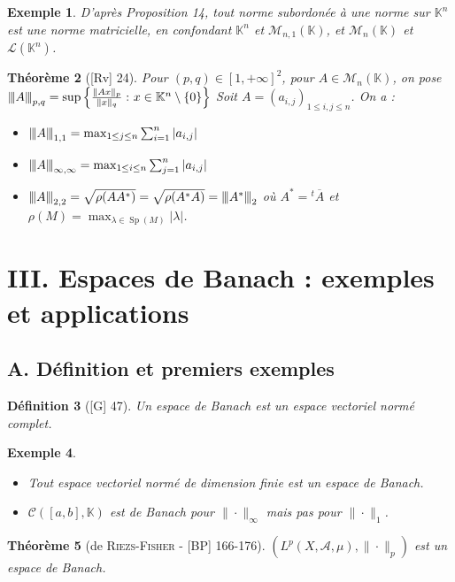 \documentclass[10pt, a4paper, parskip=full, twoside, twocolumn]{report}
\newtheorem{definition}{Définition}
\newtheorem{theorem}[definition]{Théorème}
\newtheorem{example}[definition]{Exemple}
\newcommand{\IK}{\mathbb{K}}
\newcommand{\M}{\mathcal{M}}
\newcommand{\A}{\mathcal{A}}
\DeclareMathOperator{\Sp}{Sp}
\newcommand{\vertiii}[1]{{\left\vert\kern-0.25ex\left\vert\kern-0.25ex\left\vert #1 
    \right\vert\kern-0.25ex\right\vert\kern-0.25ex\right\vert}}
\begin{document}
\begin{example}
	D'après Proposition 14, tout norme subordonée à une norme sur $\IK^n$ est une norme matricielle, en confondant $\IK^n$ et $\M_{n,1}(\IK)$, et $\M_n(\IK)$ et $\mathcal{L}(\IK^n)$.
\end{example}

\begin{theorem}[\textnormal{[Rv] 24}]
	Pour $(p,q)\in[1,+\infty]^2$, pour $A\in\M_n(\IK)$, on pose $\vertiii{A}_{p,q} = \sup\left\{\frac{\|Ax\|_p}{\|x\|_q}\,\colon x\in\IK^n\setminus \{0\}\right\}$
	Soit $A =\left(a_{i,j}\right)_{1\leq i,j\leq n}$. On a :
	\begin{itemize}
		\item $\vertiii{A}_{1,1} = \max_{1\leq j\leq n}\sum_{i=1}^{n}\vert a_{i,j}\vert$
		\item $\vertiii{A}_{\infty,\infty} = \max_{1\leq i\leq n}\sum_{j=1}^{n}\vert a_{i,j}\vert$
		\item $\vertiii{A}_{2,2} = \sqrt{\rho(AA^*)} = \sqrt{\rho(A^*A)} = \vertiii{A^*}_2$ où $A^* = {}^t\overline{A}$ et $\rho(M) = \max_{\lambda\in\Sp(M)} \vert \lambda \vert$.
	\end{itemize}
\end{theorem}

\section*{III. Espaces de Banach : exemples et applications}
\subsection*{A. Définition et premiers exemples}

\begin{definition}[\textnormal{[G] 47}]
	Un \emph{espace de Banach} est un espace vectoriel normé complet.
\end{definition}

\begin{example}
	\begin{itemize}
		\item Tout espace vectoriel normé de dimension finie est un espace de Banach.
		\item $\mathcal{C}([a,b], \IK)$ est de Banach pour $\|\cdot\|_{\infty}$ mais pas pour $\|\cdot\|_1$.
	\end{itemize}
\end{example}

\begin{theorem}[de \textsc{Riezs-Fisher} - \textnormal{[BP] 166-176}]
	$\left(L^p(X,\A,\mu), \|\cdot\|_p\right)$ est un espace de Banach.
\end{theorem}
\end{document}
